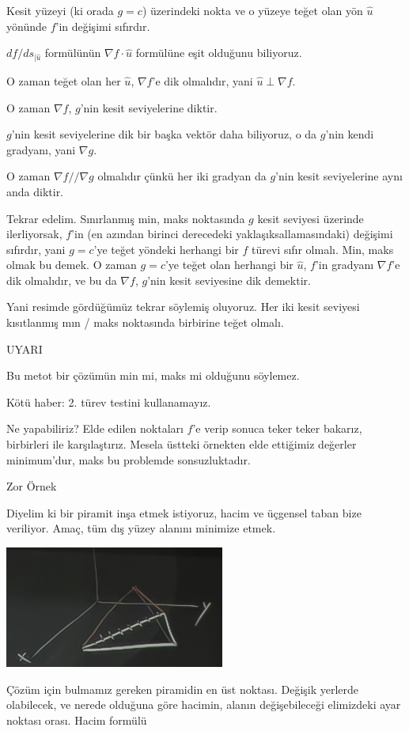 \documentclass[12pt,fleqn]{article}\usepackage{../../common}
\begin{document}
Kesit yüzeyi (ki orada $g=c$) üzerindeki nokta ve o yüzeye teğet olan yön
$\hat{u}$ yönünde $f$'in değişimi sıfırdır. 

$df / ds_{|\hat{u}}$ formülünün $\nabla f \cdot \hat{u}$ formülüne eşit olduğunu 
 biliyoruz. 

O zaman teğet olan her $\hat{u}$, $\nabla f$'e dik olmalıdır, yani $\hat{u} 
\perp \nabla f$. 

O zaman $\nabla f$, $g$'nin kesit seviyelerine diktir. 

$g$'nin kesit seviyelerine dik bir başka vektör daha biliyoruz, o 
da $g$'nin kendi gradyanı, yani $\nabla g$. 

O zaman $\nabla f // \nabla g$ olmalıdır çünkü her iki gradyan da $g$'nin
kesit seviyelerine aynı anda diktir. 

Tekrar edelim. Sınırlanmış min, maks noktasında $g$ kesit seviyesi üzerinde
ilerliyorsak, $f$'in (en azından birinci derecedeki yaklaşıksallamasındaki)
değişimi sıfırdır, yani $g=c$'ye teğet yöndeki herhangi bir $f$ türevi sıfır
olmalı. Min, maks olmak bu demek. O zaman $g=c$'ye teğet olan herhangi bir
$\hat{u}$, $f$'in gradyanı $\nabla f$'e dik olmalıdır, ve bu da $\nabla f$,
$g$'nin kesit seviyesine dik demektir. 

Yani resimde gördüğümüz tekrar söylemiş oluyoruz. Her iki kesit seviyesi
kısıtlanmış mın / maks noktasında birbirine teğet olmalı.

UYARI

Bu metot bir çözümün min mi, maks mi olduğunu söylemez. 

Kötü haber: 2. türev testini kullanamayız. 

Ne yapabiliriz? Elde edilen noktaları $f$'e verip sonuca teker teker
bakarız, birbirleri ile karşılaştırız. Mesela üstteki örnekten elde
ettiğimiz değerler minimum'dur, maks bu problemde sonsuzluktadır.

Zor Örnek

Diyelim ki bir piramit inşa etmek istiyoruz, hacim ve üçgensel taban bize
veriliyor. Amaç, tüm dış yüzey alanını minimize etmek. 
\begin{center}
\includegraphics[height=4cm]{13_8.png}
\end{center}
Çözüm için bulmamız gereken piramidin en üst noktası. Değişik yerlerde
olabilecek, ve nerede olduğuna göre hacimin, alanın değişebileceği
elimizdeki ayar noktası orası. Hacim formülü
\end{document}
